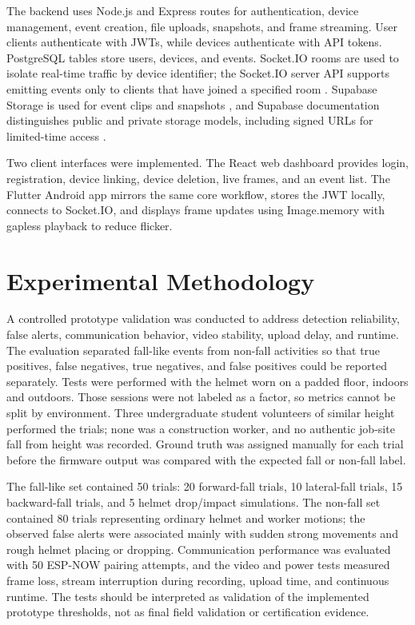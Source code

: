 \documentclass[conference]{IEEEtran}
\begin{document}
The backend uses Node.js and Express routes for authentication, device management, event creation, file uploads, snapshots, and frame streaming. User clients authenticate with JWTs, while devices authenticate with API tokens. PostgreSQL tables store users, devices, and events. Socket.IO rooms are used to isolate real-time traffic by device identifier; the Socket.IO server API supports emitting events only to clients that have joined a specified room \cite{socketio2026}. Supabase Storage is used for event clips and snapshots \cite{supabase2026}, and Supabase documentation distinguishes public and private storage models, including signed URLs for limited-time access \cite{supabasebuckets2026}.

Two client interfaces were implemented. The React web dashboard provides login, registration, device linking, device deletion, live frames, and an event list. The Flutter Android app mirrors the same core workflow, stores the JWT locally, connects to Socket.IO, and displays frame updates using Image.memory with gapless playback to reduce flicker.

\section{Experimental Methodology}
A controlled prototype validation was conducted to address detection reliability, false alerts, communication behavior, video stability, upload delay, and runtime. The evaluation separated fall-like events from non-fall activities so that true positives, false negatives, true negatives, and false positives could be reported separately. Tests were performed with the helmet worn on a padded floor, indoors and outdoors. Those sessions were not labeled as a factor, so metrics cannot be split by environment. Three undergraduate student volunteers of similar height performed the trials; none was a construction worker, and no authentic job-site fall from height was recorded. Ground truth was assigned manually for each trial before the firmware output was compared with the expected fall or non-fall label.

The fall-like set contained 50 trials: 20 forward-fall trials, 10 lateral-fall trials, 15 backward-fall trials, and 5 helmet drop/impact simulations. The non-fall set contained 80 trials representing ordinary helmet and worker motions; the observed false alerts were associated mainly with sudden strong movements and rough helmet placing or dropping. Communication performance was evaluated with 50 ESP-NOW pairing attempts, and the video and power tests measured frame loss, stream interruption during recording, upload time, and continuous runtime. The tests should be interpreted as validation of the implemented prototype thresholds, not as final field validation or certification evidence.
\end{document}
